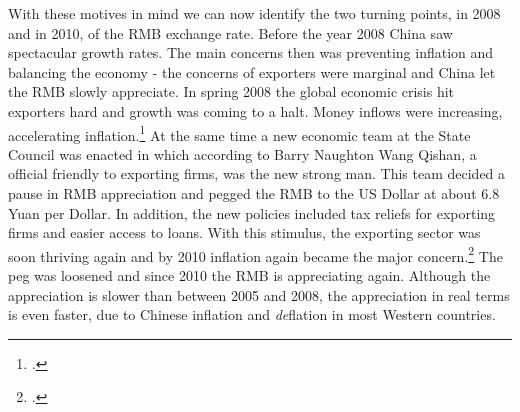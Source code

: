 With these motives in mind we can now identify the two turning points, in 2008 and in 2010, of the RMB exchange rate. Before the year 2008 China saw spectacular growth rates. The main concerns then was preventing inflation and balancing the economy - the concerns of exporters were marginal and China let the RMB slowly appreciate. In spring 2008 the global economic crisis hit exporters hard and growth was coming to a halt. Money inflows were increasing, accelerating inflation.\footnote{\cite{Naughton2008}.} At the same time a new economic team at the State Council was enacted in which according to Barry Naughton Wang Qishan, a official friendly to exporting firms, was the new strong man. This team decided a pause in RMB appreciation and pegged the RMB to the US Dollar at about 6.8 Yuan per Dollar. In addition, the new policies included tax reliefs for exporting firms and easier access to loans. With this stimulus, the exporting sector was soon thriving again and by 2010 inflation again became the major concern.\footnote{\cite{Naughton2010}.} The peg was loosened and since 2010 the RMB is appreciating again. Although the appreciation is slower than between 2005 and 2008, the appreciation in real terms is even faster, due to Chinese inflation and \emph{de}flation in most Western countries.



